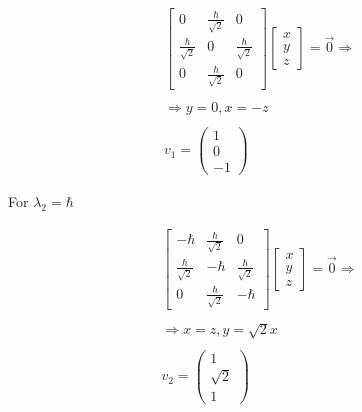 \begin{equation}
  \begin{array}{c}
    \left[\begin{matrix}
      0 & \frac{\hbar}{\sqrt{2}} & 0\\
      \frac{\hbar}{\sqrt{2}} & 0 & \frac{\hbar}{\sqrt{2}}\\
      0 & \frac{\hbar}{\sqrt{2}} & 0
    \end{matrix}\right]\left[\begin{matrix}
      x\\
      y\\
      z
    \end{matrix}\right] = \vec{0} \Rightarrow
    \\

    \\
    \Rightarrow y = 0, x = -z
    \\

    \\
    v_1 = \left( \begin{matrix}
      1\\
      0\\
      -1
    \end{matrix}\right)
  \end{array}
\end{equation}

For $\lambda_2 = \hbar$

\begin{equation}
  \begin{array}{c}
    \left[\begin{matrix}
      -\hbar & \frac{\hbar}{\sqrt{2}} & 0\\
      \frac{\hbar}{\sqrt{2}} & -\hbar & \frac{\hbar}{\sqrt{2}}\\
      0 & \frac{\hbar}{\sqrt{2}} & -\hbar
    \end{matrix}\right]
    \left[\begin{matrix}
      x\\
      y\\
      z
    \end{matrix}\right] = \vec{0} \Rightarrow
    \\

    \\
    \Rightarrow x = z, y = \sqrt{2}x
    \\

    \\
    v_2 = \left(\begin{matrix}
      1\\
      \sqrt{2}\\
      1
    \end{matrix}\right)
  \end{array}
\end{equation}

